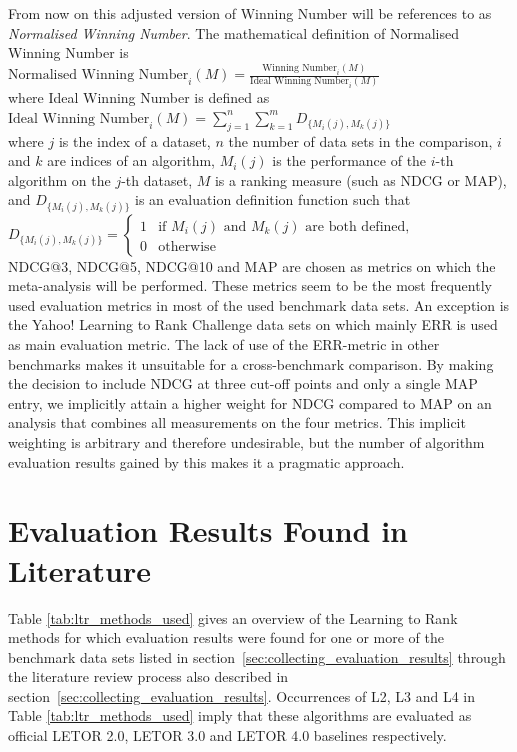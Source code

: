From now on this adjusted version of Winning Number will be references to as \emph{Normalised Winning Number}. The mathematical definition of Normalised Winning Number is\\

$\text{Normalised Winning Number}_i(M) = \frac{\text{Winning Number}_i(M)}{\text{Ideal Winning Number}_i(M)}$\\

\noindent
where Ideal Winning Number is defined as\\

$\text{Ideal Winning Number}_i(M) = \sum\nolimits_{j=1}^n \sum\nolimits_{k=1}^m D_{\{M_i(j),M_k(j)\}}$\\

where $j$ is the index of a dataset, $n$ the number of data sets in the comparison, $i$ and $k$ are indices of an algorithm, $M_i(j)$ is the performance of the $i$-th algorithm on the $j$-th dataset, $M$ is a ranking measure (such as \ac{NDCG} or \ac{MAP}), and $D_{\{M_i(j),M_k(j)\}}$ is an evaluation definition function such that\\

$D_{\{M_i(j),M_k(j)\}} = \begin{cases}
1 & \text{if } M_i(j) \text{ and } M_k(j) \text{ are both defined}, \\
0 & \text{otherwise}
\end{cases}$\\

\ac{NDCG}@3, \ac{NDCG}@5, \ac{NDCG}@10 and \ac{MAP} are chosen as metrics on which the meta-analysis will be performed. These metrics seem to be the most frequently used evaluation metrics in most of the used benchmark data sets. An exception is the Yahoo! Learning to Rank Challenge data sets on which mainly \ac{ERR} is used as main evaluation metric. The lack of use of the \ac{ERR}-metric in other benchmarks makes it unsuitable for a cross-benchmark comparison. By making the decision to include \ac{NDCG} at three cut-off points and only a single \ac{MAP} entry, we implicitly attain a higher weight for \ac{NDCG} compared to \ac{MAP} on an analysis that combines all measurements on the four metrics. This implicit weighting is arbitrary and therefore undesirable, but the number of algorithm evaluation results gained by this makes it a pragmatic approach.

\section{Evaluation Results Found in Literature}
Table \ref{tab:ltr_methods_used} gives an overview of the Learning to Rank methods for which evaluation results were found for one or more of the benchmark data sets listed in section~\ref{sec:collecting_evaluation_results} through the literature review process also described in section~\ref{sec:collecting_evaluation_results}. Occurrences of L2, L3 and L4 in Table \ref{tab:ltr_methods_used} imply that these algorithms are evaluated as official LETOR 2.0, LETOR 3.0 and LETOR 4.0 baselines respectively.\\

